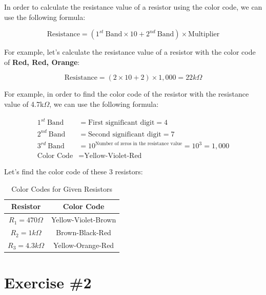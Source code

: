 In order to calculate the resistance value of a resistor using the color code, we can use the following formula:

\[
    \text{Resistance} = (1^{st}~\text{Band} \times 10 + 2^{nd}~\text{Band}) \times \text{Multiplier}
\]

For example, let's calculate the resistance value of a resistor with the color code of \textbf{Red, Red, Orange}:

\[
    \text{Resistance} = (2 \times 10 + 2) \times 1,000 = 22k\Omega
\]

\newpage
\thispagestyle{plain}

For example, in order to find the color code of the resistor with the resistance value of 4.7k\(\Omega\), we can use the following formula:

\begin{align*}
    1^{st}~\text{Band} &= \text{First significant digit} = 4 \\
    2^{nd}~\text{Band} &= \text{Second significant digit} = 7 \\
    3^{rd}~\text{Band} &= 10^{\text{Number of zeros in the resistance value}} = 10^3 = 1,000 \\
    \text{Color Code} &= \text{Yellow-Violet-Red}
\end{align*}


\bigbreak{}
\bigbreak{}

Let's find the color code of these $3$ resistors:
\begin{table}[h]
    \centering
    \begin{tabular}{|c|c|}
    \hline
    Resistor & Color Code \\
    \hline
    \(R_1 = 470\Omega\) & Yellow-Violet-Brown \\
    \(R_2 = 1k\Omega\) & Brown-Black-Red \\
    \(R_3 = 4.3k\Omega\) & Yellow-Orange-Red \\
    \hline
    \end{tabular}
    \caption{Color Codes for Given Resistors}
\end{table}

\newpage
\thispagestyle{plain}

\section{Exercise \#2}


